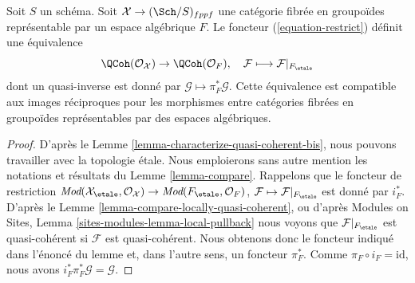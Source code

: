 \begin{lemma}
\label{lemma-compare-quasi-coherent}
Soit $S$ un schéma. Soit $\mathcal{X} \to (\Sch/S)_{fppf}$ une catégorie
fibrée en groupoïdes représentable par un espace algébrique $F$.
Le foncteur (\ref{equation-restrict}) définit une équivalence
$$
\QCoh(\mathcal{O}_\mathcal{X}) \to \QCoh(\mathcal{O}_F),\quad
\mathcal{F} \longmapsto \mathcal{F}|_{F_\etale}
$$
dont un quasi-inverse est donné par $\mathcal{G} \mapsto \pi_F^*\mathcal{G}$.
Cette équivalence est compatible aux images réciproques pour les morphismes entre
catégories fibrées en groupoïdes représentables par des espaces algébriques.
\end{lemma}

\begin{proof}
D'après le Lemme \ref{lemma-characterize-quasi-coherent-bis}, nous pouvons travailler avec
la topologie étale. Nous emploierons sans autre mention les notations et résultats du
Lemme \ref{lemma-compare}.
Rappelons que le foncteur de restriction
$\textit{Mod}(\mathcal{X}_\etale, \mathcal{O}_\mathcal{X}) \to
\textit{Mod}(F_\etale, \mathcal{O}_F)$,
$\mathcal{F} \mapsto \mathcal{F}|_{F_\etale}$ est donné par $i_F^*$. D'après le
Lemme \ref{lemma-compare-locally-quasi-coherent}, ou d'après
Modules on Sites, Lemma \ref{sites-modules-lemma-local-pullback}
nous voyons que $\mathcal{F}|_{F_\etale}$ est quasi-cohérent si
$\mathcal{F}$ est quasi-cohérent.
Nous obtenons donc le foncteur indiqué dans l'énoncé du
lemme et, dans l'autre sens, un foncteur $\pi_F^*$.
Comme $\pi_F \circ i_F = \text{id}$, nous avons
$i_F^*\pi_F^*\mathcal{G} = \mathcal{G}$.


\end{proof}
